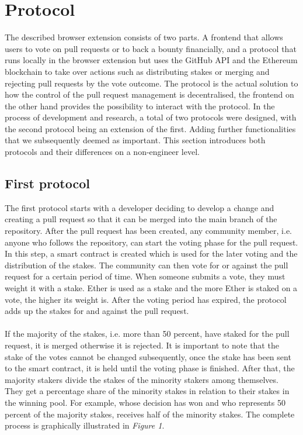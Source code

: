 \documentclass[sigconf]{acmart}
\begin{document}
\section{Protocol}
The described browser extension consists of two parts. A frontend that allows users to vote on pull requests or to back 
a bounty financially, and a protocol that runs locally in the browser extension but uses the GitHub API and the Ethereum 
blockchain to take over actions such as distributing stakes or merging and rejecting pull requests by the vote outcome.
The protocol is the actual solution to how the control of the pull request management is decentralised, the frontend on the 
other hand provides the possibility to interact with the protocol. In the process of development and research, a total of two 
protocols were designed, with the second protocol being an extension of the first. Adding further functionalities that we 
subsequently deemed as important. This section introduces both protocols and their differences on a non-engineer level.

\subsection{First protocol}
The first protocol starts with a developer deciding to develop a change and creating a pull request so that it can be merged into the 
main branch of the repository. After the pull request has been created, any community member, i.e. anyone who follows the repository, 
can start the voting phase for the pull request. In this step, a smart contract is created which is used for the later voting and the distribution
 of the stakes. The community can then vote for or against the pull request for a certain period of time.
When someone submits a vote, they must weight it with a stake. Ether is used as a stake and the more Ether is staked on a vote, 
the higher its weight is. After the voting period has expired, the protocol adds up the stakes for and against the pull request. \\ \\
If the majority of the stakes, i.e. more than 50 percent, have staked for the pull request, it is merged otherwise it is rejected.
It is important to note that the stake of the votes cannot be changed subsequently, once the stake has been sent to the smart contract, 
it is held until the voting phase is finished. After that, the majority stakers divide the stakes of the minority stakers among themselves. 
They get a percentage share of the minority stakes in relation to their stakes in the winning pool. For example, whose decision has won
 and who represents 50 percent of the majority stakes, receives half of the minority stakes. The complete process is graphically 
illustrated in \textit{Figure 1}.
\end{document}
